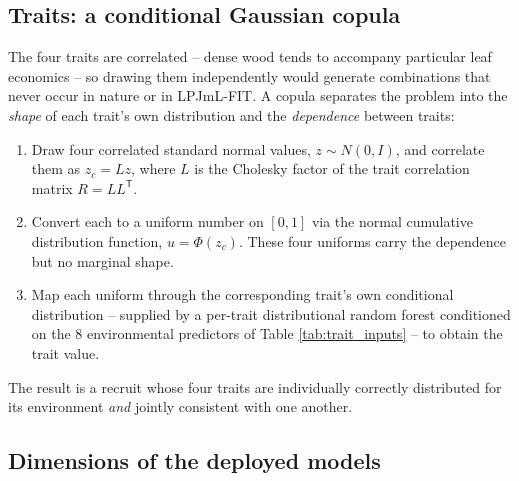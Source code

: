 \documentclass[11pt]{article}
\begin{document}
\subsection{Traits: a conditional Gaussian copula}

The four traits are correlated -- dense wood tends to accompany particular leaf economics -- so drawing them independently would generate combinations that never occur in nature or in LPJmL-FIT. A copula separates the problem into the \emph{shape} of each trait's own distribution and the \emph{dependence} between traits:

\begin{enumerate}[leftmargin=1.6em]
\item Draw four correlated standard normal values, $z \sim N(0, I)$, and correlate them as $z_c = L z$, where $L$ is the Cholesky factor of the trait correlation matrix $R = L L^{\mathsf{T}}$.
\item Convert each to a uniform number on $[0,1]$ via the normal cumulative distribution function, $u = \Phi(z_c)$. These four uniforms carry the dependence but no marginal shape.
\item Map each uniform through the corresponding trait's own conditional distribution -- supplied by a per-trait distributional random forest conditioned on the 8 environmental predictors of Table \ref{tab:trait_inputs} -- to obtain the trait value.
\end{enumerate}

The result is a recruit whose four traits are individually correctly distributed for its environment \emph{and} jointly consistent with one another.

\subsection{Dimensions of the deployed models}
\end{document}
